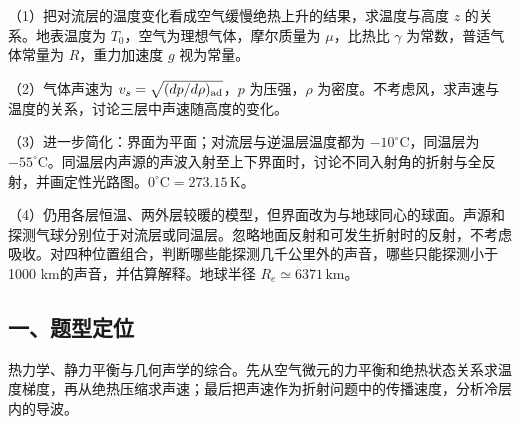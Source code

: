 \documentclass[12pt,a4paper,fontset=fandol]{ctexart}
\begin{document}
\begin{center}
\begin{minipage}{\linewidth}
\centering\begingroup{}
\ifdim\wd\diagrambox>.88\linewidth
\sbox{\diagrambox}{\resizebox{.88\linewidth}{!}{\usebox{\diagrambox}}}\fi
\ifdim\ht\diagrambox>.38\textheight
\resizebox{!}{.38\textheight}{\usebox{\diagrambox}}
\else\usebox{\diagrambox}\fi
\par{}\endgroup\end{minipage}\end{center}

（1）把对流层的温度变化看成空气缓慢绝热上升的结果，求温度与高度 \(z\)
的关系。地表温度为 \(T_0\)，空气为理想气体，摩尔质量为 \(\mu\)，比热比
\(\gamma\) 为常数，普适气体常量为 \(R\)，重力加速度 \(g\) 视为常量。

（2）气体声速为 \(v_s=\sqrt{(dp/d\rho)_{\rm ad}}\)，\(p\)
为压强，\(\rho\)
为密度。不考虑风，求声速与温度的关系，讨论三层中声速随高度的变化。

（3）进一步简化：界面为平面；对流层与逆温层温度都为
\(-10^\circ\mathrm C\)，同温层为
\(-55^\circ\mathrm C\)。同温层内声源的声波入射至上下界面时，讨论不同入射角的折射与全反射，并画定性光路图。\(0^\circ\mathrm C=273.15\,\mathrm K\)。

（4）仍用各层恒温、两外层较暖的模型，但界面改为与地球同心的球面。声源和探测气球分别位于对流层或同温层。忽略地面反射和可发生折射时的反射，不考虑吸收。对四种位置组合，判断哪些能探测几千公里外的声音，哪些只能探测小于1000
km的声音，并估算解释。地球半径 \(R_e\simeq6371\,\mathrm{km}\)。

\subsection{一、题型定位}\label{ux4e00ux9898ux578bux5b9aux4f4d-6}

热力学、静力平衡与几何声学的综合。先从空气微元的力平衡和绝热状态关系求温度梯度，再从绝热压缩求声速；最后把声速作为折射问题中的传播速度，分析冷层内的导波。
\end{document}
